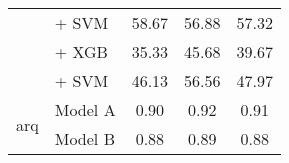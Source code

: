 \begin{table*}[h]
{\begin{tabular}{llccc}
                                               & \citep{rasyosef2025llamaamharic} + SVM                      & 58.67                                & 56.88              & 57.32             \\
                                               & \citep{rasyosef2025robertaamharic} + XGB                    & 35.33                                & 45.68              & 39.67             \\
                                               & \citep{rasyosef2025robertaamharic} + SVM                    & 46.13                                & 56.56              & 47.97             \\
            \midrule
            \multirow{2}{*}{arq}        & Model A                                                     & 0.90                                 & 0.92               & 0.91              \\
                                               & Model B                                                     & 0.88                                 & 0.89               & 0.88              \\
            \bottomrule
        \end{tabular}
    }
\end{table*}